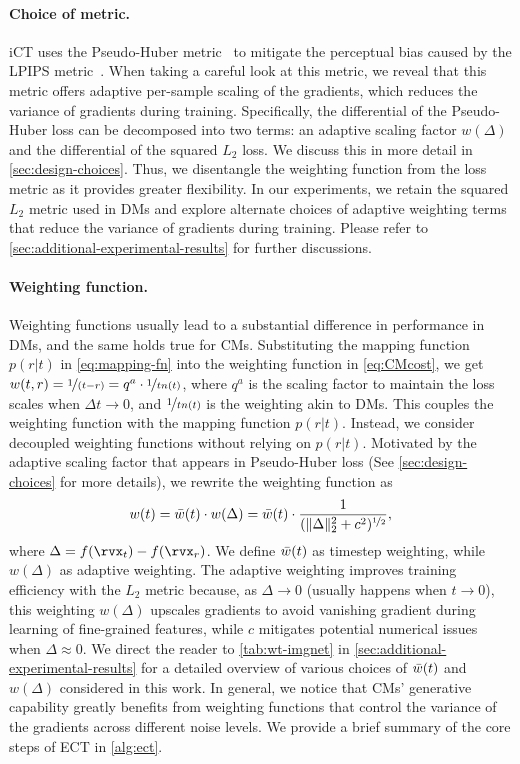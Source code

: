 \documentclass{article}
\begin{document}
\vspace{-3pt}
\paragraph{Choice of metric.} iCT uses the Pseudo-Huber metric~\citep{huber} to mitigate the perceptual bias caused by the LPIPS metric~\citep{lpips}. 
When taking a careful look at this metric, we reveal that this metric offers adaptive per-sample scaling of the gradients, which reduces the variance of gradients during training.
Specifically, the differential of the Pseudo-Huber loss can be decomposed into two terms: an adaptive scaling factor $w(\Delta)$ and the differential of the squared $L_2$ loss. We discuss this in more detail in \cref{sec:design-choices}. 
Thus, we disentangle the weighting function from the loss metric as it provides greater flexibility. In our experiments, we retain the squared $L_2$ metric used in DMs and explore alternate choices of adaptive weighting terms that reduce the variance of gradients during training. Please refer to \cref{sec:additional-experimental-results} for further discussions.

\vspace{-3pt}
\paragraph{Weighting function.} 
Weighting functions usually lead to a substantial difference in performance in DMs, and the same holds true for CMs. 
Substituting the mapping function $p(r|t)$ in \cref{eq:mapping-fn} into the weighting function in \cref{eq:CMcost}, we get $w(t, r) = \nicefrac{1}{(t - r)} = q^a \cdot \nicefrac{1}{tn(t)}$, where $q^a$ is the scaling factor to maintain the loss scales when $\Delta t \to 0$, and $\nicefrac{1}{tn(t)}$ is the weighting akin to DMs. 
This couples the weighting function with the mapping function $p(r|t)$. Instead, we consider decoupled weighting functions without relying on $p(r|t)$.
Motivated by the adaptive scaling factor that appears in Pseudo-Huber loss (See \cref{sec:design-choices} for more details), we rewrite the weighting function as 
%
\begin{equation}
w(t) = \Bar{w}(t) \cdot w(\Delta) = \Bar{w}(t) \cdot \frac{1}{(\|\Delta \|_2^2 + c^2)^{\nicefrac{1}{2}}},
\end{equation}
%
where $\Delta = f(\rvx_t) - f(\rvx_r)$. We define $\Bar{w}(t)$ as timestep weighting, while $w(\Delta)$ as adaptive weighting.
The adaptive weighting improves training efficiency with the $L_2$ metric because, as $\Delta \to 0$ (usually happens when $t \to 0$), this weighting $ w(\Delta)$ upscales gradients to avoid vanishing gradient during learning of fine-grained features, while $c$ mitigates potential numerical issues when $\Delta \approx 0$.
%
We direct the reader to \cref{tab:wt-imgnet} in \cref{sec:additional-experimental-results} for a detailed overview of various choices of $\Bar{w}(t)$ and $w(\Delta)$ considered in this work.
In general, we notice that CMs' generative capability greatly benefits from weighting functions that control the variance of the gradients across different noise levels. 
We provide a brief summary of the core steps of ECT in \cref{alg:ect}.
\end{document}
